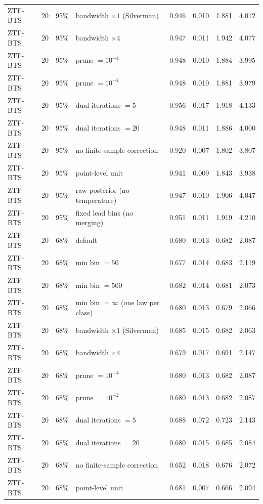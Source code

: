 \begin{longtable}{lllp{4.2cm}cccc}
ZTF-BTS & 20 & 95\% & bandwidth $\times 1$ (Silverman) & 0.946 & 0.010 & 1.881 & 4.012 \\
ZTF-BTS & 20 & 95\% & bandwidth $\times 4$ & 0.947 & 0.011 & 1.942 & 4.077 \\
ZTF-BTS & 20 & 95\% & prune $= 10^{-4}$ & 0.948 & 0.010 & 1.884 & 3.995 \\
ZTF-BTS & 20 & 95\% & prune $= 10^{-2}$ & 0.948 & 0.010 & 1.881 & 3.979 \\
ZTF-BTS & 20 & 95\% & dual iterations $= 5$ & 0.956 & 0.017 & 1.918 & 4.133 \\
ZTF-BTS & 20 & 95\% & dual iterations $= 20$ & 0.948 & 0.011 & 1.886 & 4.000 \\
ZTF-BTS & 20 & 95\% & no finite-sample correction & 0.920 & 0.007 & 1.802 & 3.807 \\
ZTF-BTS & 20 & 95\% & point-level unit & 0.941 & 0.009 & 1.843 & 3.938 \\
ZTF-BTS & 20 & 95\% & raw posterior (no temperature) & 0.947 & 0.010 & 1.906 & 4.047 \\
ZTF-BTS & 20 & 95\% & fixed lead bins (no merging) & 0.951 & 0.011 & 1.919 & 4.210 \\
ZTF-BTS & 20 & 68\% & default & 0.680 & 0.013 & 0.682 & 2.087 \\
ZTF-BTS & 20 & 68\% & min bin $= 50$ & 0.677 & 0.014 & 0.683 & 2.119 \\
ZTF-BTS & 20 & 68\% & min bin $= 500$ & 0.682 & 0.014 & 0.681 & 2.073 \\
ZTF-BTS & 20 & 68\% & min bin $= \infty$ (one law per class) & 0.680 & 0.013 & 0.679 & 2.066 \\
ZTF-BTS & 20 & 68\% & bandwidth $\times 1$ (Silverman) & 0.685 & 0.015 & 0.682 & 2.063 \\
ZTF-BTS & 20 & 68\% & bandwidth $\times 4$ & 0.679 & 0.017 & 0.691 & 2.147 \\
ZTF-BTS & 20 & 68\% & prune $= 10^{-4}$ & 0.680 & 0.013 & 0.682 & 2.087 \\
ZTF-BTS & 20 & 68\% & prune $= 10^{-2}$ & 0.680 & 0.013 & 0.682 & 2.087 \\
ZTF-BTS & 20 & 68\% & dual iterations $= 5$ & 0.688 & 0.072 & 0.723 & 2.143 \\
ZTF-BTS & 20 & 68\% & dual iterations $= 20$ & 0.680 & 0.015 & 0.685 & 2.084 \\
ZTF-BTS & 20 & 68\% & no finite-sample correction & 0.652 & 0.018 & 0.676 & 2.072 \\
ZTF-BTS & 20 & 68\% & point-level unit & 0.681 & 0.007 & 0.666 & 2.094 \\

\end{longtable}
